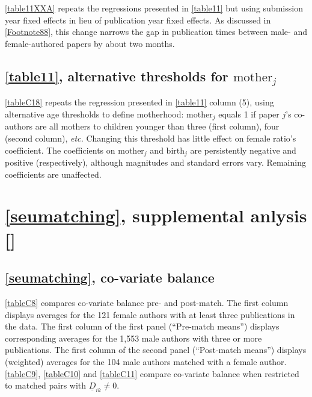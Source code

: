 \begin{appendices}
\autoref{table11XXA} repeats the regressions pre\-sented in \autoref{table11} but using submission year fixed effects in lieu of publication year fixed effects. As discussed in \autoref{Footnote88}, this change narrows the gap in publication times between male- and female-authored papers by about two months.



\clearpage

\subsection{\autoref{table11}, alternative thresholds for $\text{mother}_j$}
\label{appendixmotherhood}

\autoref{tableC18} repeats the regression pre\-sented in \autoref{table11} column (5), using alternative age thresholds to define motherhood: $\text{mother}_j$ equals 1 if paper $j$'s co-authors are all mothers to children younger than three (first column), four (second column), \emph{etc.} Changing this threshold has little effect on female ratio's coefficient. The coefficients on $\text{mother}_j$ and $\text{birth}_j$ are persistently negative and positive (respectively), although magnitudes and standard errors vary. Remaining coefficients are unaffected.



\clearpage

\section{\autoref{seumatching}, supplemental anlysis []}
\label{seumatchingsupplementalanlysis}

\subsection{\autoref{seumatching}, co-variate balance}
\label{appendixmatchingbalance}

\autoref{tableC8} compares co-variate balance pre- and post-match. The first column displays averages for the 121 female authors with at least three publications in the data. The first column of the first panel (``Pre-match means'') displays corresponding averages for the 1,553 male authors with three or more publications. The first column of the second panel (``Post-match means'') displays (weighted) averages for the 104 male authors matched with a female author. \autoref{tableC9}, \autoref{tableC10} and \autoref{tableC11} compare co-variate balance when restricted to matched pairs with $\underline D_{ik}\ne0$.


\end{appendices}
